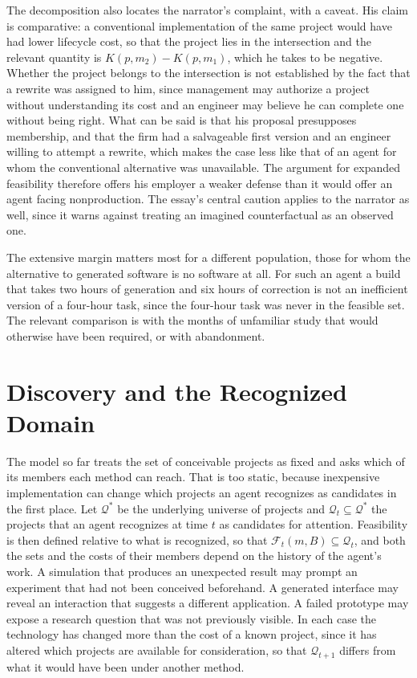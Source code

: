 \documentclass[11pt]{article}
\theoremstyle{remark}
\newcommand{\Q}{\mathcal{Q}}
\newcommand{\F}{\mathcal{F}}
\begin{document}
The decomposition also locates the narrator's complaint, with a caveat. His claim is comparative: a conventional implementation of the same project would have had lower lifecycle cost, so that the project lies in the intersection and the relevant quantity is $K(p,m_2)-K(p,m_1)$, which he takes to be negative. Whether the project belongs to the intersection is not established by the fact that a rewrite was assigned to him, since management may authorize a project without understanding its cost and an engineer may believe he can complete one without being right. What can be said is that his proposal presupposes membership, and that the firm had a salvageable first version and an engineer willing to attempt a rewrite, which makes the case less like that of an agent for whom the conventional alternative was unavailable. The argument for expanded feasibility therefore offers his employer a weaker defense than it would offer an agent facing nonproduction. The essay's central caution applies to the narrator as well, since it warns against treating an imagined counterfactual as an observed one.

The extensive margin matters most for a different population, those for whom the alternative to generated software is no software at all. For such an agent a build that takes two hours of generation and six hours of correction is not an inefficient version of a four-hour task, since the four-hour task was never in the feasible set. The relevant comparison is with the months of unfamiliar study that would otherwise have been required, or with abandonment.

\section{Discovery and the Recognized Domain}

The model so far treats the set of conceivable projects as fixed and asks which of its members each method can reach. That is too static, because inexpensive implementation can change which projects an agent recognizes as candidates in the first place. Let $\Q^{*}$ be the underlying universe of projects and $\Q_t\subseteq\Q^{*}$ the projects that an agent recognizes at time $t$ as candidates for attention. Feasibility is then defined relative to what is recognized, so that $\F_t(m,B)\subseteq\Q_t$, and both the sets and the costs of their members depend on the history of the agent's work. A simulation that produces an unexpected result may prompt an experiment that had not been conceived beforehand. A generated interface may reveal an interaction that suggests a different application. A failed prototype may expose a research question that was not previously visible. In each case the technology has changed more than the cost of a known project, since it has altered which projects are available for consideration, so that $\Q_{t+1}$ differs from what it would have been under another method.
\end{document}
